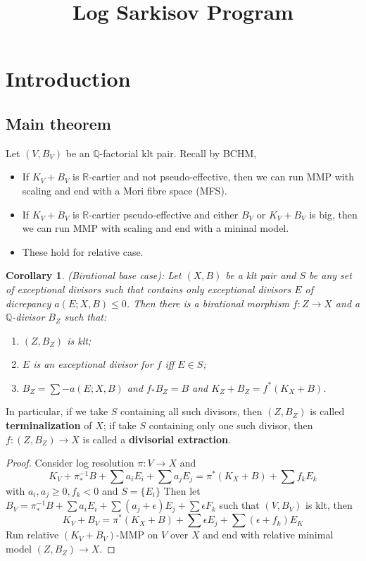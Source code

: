 \documentclass{article}
\title{Log Sarkisov Program}
\date{}
\newtheorem{cor}[defn]{Corollary}
\begin{document}
\maketitle
\tableofcontents
\newpage
\section{Introduction}
\subsection{Main theorem}
Let $ (V,B_V) $ be an $ \mathbb{Q} $-factorial klt pair. Recall by BCHM,
\begin{itemize}
  \item If  $ K_V+B_V $ is $ \mathbb{R} $-cartier and not pseudo-effective, then we can run MMP with scaling and  end with a Mori fibre space (MFS).
  \item If $ K_V+B_V $ is $ \mathbb{R} $-cartier pseudo-effective and either $ B_V $ or $ K_V+B_V $ is big, then we can run MMP with scaling and end with a mininal model.
  \item These hold for relative case.
\end{itemize}
\begin{cor}\label{extraction}
  (Birational base case): Let $ (X,B) $ be a klt pair and $ S $ be any set of exceptional divisors such that  contains only exceptional divisors $ E $ of dicrepancy $ a(E;X,B)\leqslant 0 $. Then there is a birational morphism $ f:Z\to X $ and a $ \mathbb{Q} $-divisor $ B_Z $ such that:
  \begin{enumerate}
    \item $ (Z,B_Z) $ is klt;
    \item $ E $ is an exceptional divisor for $ f $ iff $ E\in S $;
    \item $ B_Z=\sum-a(E;X,B) $ and $ f_*B_Z=B $ and $ K_Z+B_Z=f^*(K_X+B) $.
  \end{enumerate}
\end{cor}
In particular, if we take $ S $ containing all such divisors, then $ (Z,B_Z) $ is called \textbf{terminalization} of $ X $; if take $ S $ containing only one such divisor, then $ f:(Z,B_Z)\to X $ is called a \textbf{divisorial extraction}.
\begin{proof}
  Consider log resolution $ \pi:V\to X $ and
  $$ K_V+\pi^{-1}_*B+\sum a_iE_i +\sum a_jE_j=\pi^*(K_X+B)+\sum f_kE_k$$
  with $ a_i,a_j\geqslant 0, f_k<0 $ and $ S=\{ E_i \} $
  Then let $ B_V=\pi^{-1}_*B+\sum a_iE_i +\sum (a_j+\epsilon)E_j+\sum \epsilon F_k $ such that $ (V,B_V) $ is klt, then
  $$ K_V+B_V=\pi^*(K_X+B)+\sum \epsilon E_j+\sum (\epsilon+f_k)E_K $$
  Run relative $ (K_V+B_V) $-MMP on $ V $ over $ X $ and end with relative minimal model $ (Z,B_Z)\to X $.
\end{proof}
\end{document}
